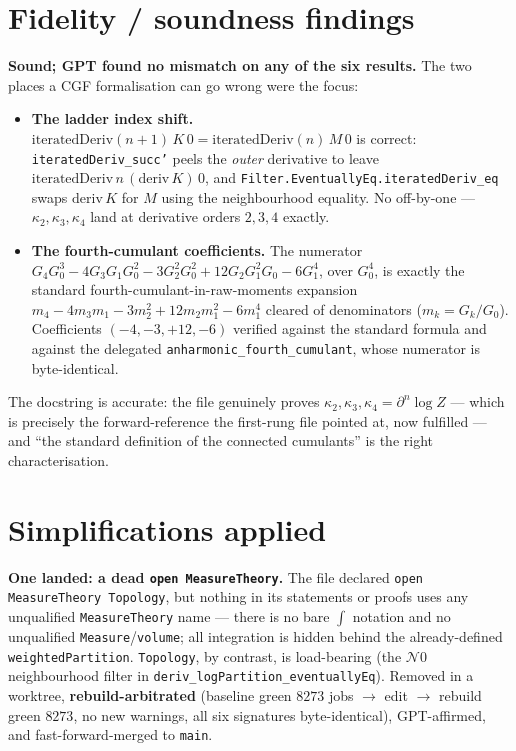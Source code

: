 \documentclass[11pt]{article}
\begin{document}
\section{Fidelity / soundness findings}
\textbf{Sound; GPT found no mismatch on any of the six results.} The two places a CGF formalisation can go
wrong were the focus:
\begin{itemize}[noitemsep]
  \item \textbf{The ladder index shift.} $\mathrm{iteratedDeriv}(n{+}1)\,K\,0=\mathrm{iteratedDeriv}(n)\,M\,0$
    is correct: \texttt{iteratedDeriv\_succ'} peels the \emph{outer} derivative to leave
    $\mathrm{iteratedDeriv}\,n\,(\mathrm{deriv}\,K)\,0$, and \texttt{Filter.EventuallyEq.iteratedDeriv\_eq}
    swaps $\mathrm{deriv}\,K$ for $M$ using the neighbourhood equality. No off-by-one --- $\kappa_2,\kappa_3,
    \kappa_4$ land at derivative orders $2,3,4$ exactly.
  \item \textbf{The fourth-cumulant coefficients.} The numerator
    $G_4G_0^3-4G_3G_1G_0^2-3G_2^2G_0^2+12G_2G_1^2G_0-6G_1^4$, over $G_0^4$, is exactly the standard
    fourth-cumulant-in-raw-moments expansion $m_4-4m_3m_1-3m_2^2+12m_2m_1^2-6m_1^4$ cleared of denominators
    ($m_k=G_k/G_0$). Coefficients $(-4,-3,+12,-6)$ verified against the standard formula and against the
    delegated \texttt{anharmonic\_fourth\_cumulant}, whose numerator is byte-identical.
\end{itemize}
The docstring is accurate: the file genuinely proves $\kappa_2,\kappa_3,\kappa_4=\partial^n\log Z$ --- which
is precisely the forward-reference the first-rung file pointed at, now fulfilled --- and ``the standard
definition of the connected cumulants'' is the right characterisation.

\section{Simplifications applied}
\textbf{One landed: a dead \texttt{open MeasureTheory}.} The file declared \texttt{open MeasureTheory
Topology}, but nothing in its statements or proofs uses any unqualified \texttt{MeasureTheory} name --- there
is no bare $\int$ notation and no unqualified \texttt{Measure}/\texttt{volume}; all integration is hidden
behind the already-defined \texttt{weightedPartition}. \texttt{Topology}, by contrast, is load-bearing (the
$\mathcal N 0$ neighbourhood filter in \texttt{deriv\_logPartition\_eventuallyEq}). Removed in a worktree,
\textbf{rebuild-arbitrated} (baseline green $8273$ jobs $\to$ edit $\to$ rebuild green $8273$, no new
warnings, all six signatures byte-identical), GPT-affirmed, and fast-forward-merged to \texttt{main}.
\end{document}
